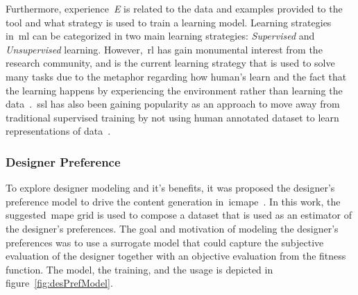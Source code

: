 Furthermore, experience~\textit{E} is related to the data and examples provided to the tool and what strategy is used to train a learning model. Learning strategies in~\acrshort{ml} can be categorized in two main learning strategies: \emph{Supervised} and \emph{Unsupervised} learning. However,~\acrfull{rl} has gain monumental interest from the research community, and is the current learning strategy that is used to solve many tasks due to the metaphor regarding how human's learn and the fact that the learning happens by experiencing the environment rather than learning the data~\cite{Juliani2019-obstacleTower}.~\acrfull{ssl} has also been gaining popularity as an approach to move away from traditional supervised training by not using human annotated dataset to learn representations of data~\cite{Doersch2017-ssl}. 


\subsubsection{Designer Preference}

To explore designer modeling and it's benefits, it was proposed the designer's preference model to drive the content generation in~\acrshort{icmape}~\cite{Alvarez2020-DesignerPreference}. In this work, the suggested~\acrshort{mape} grid is used to compose a dataset that is used as an estimator of the designer's preferences. The goal and motivation of modeling the designer's preferences was to use a surrogate model that could capture the subjective evaluation of the designer together with an objective evaluation from the fitness function. The model, the training, and the usage is depicted in figure~\ref{fig:desPrefModel}. 

